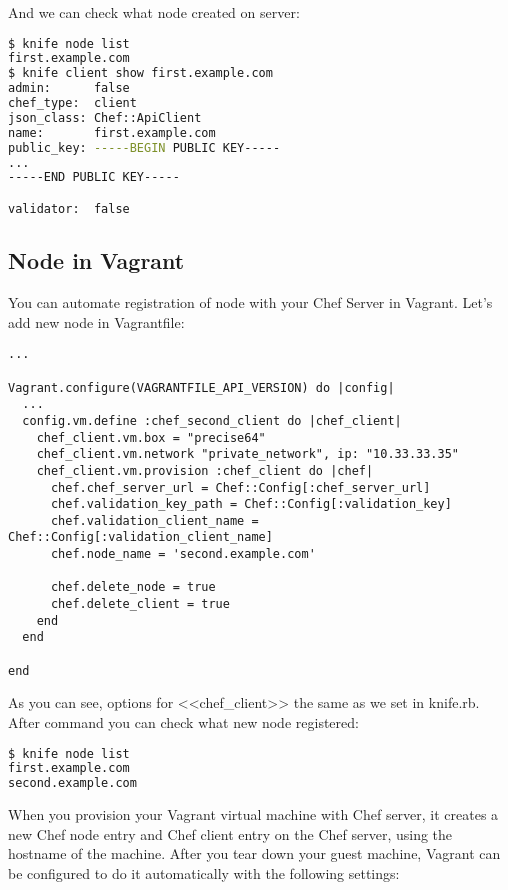 And we can check what node created on server:

\begin{lstlisting}[language=Bash,label=lst:my-server-cloud-node6]
$ knife node list
first.example.com
$ knife client show first.example.com
admin:      false
chef_type:  client
json_class: Chef::ApiClient
name:       first.example.com
public_key: -----BEGIN PUBLIC KEY-----
...
-----END PUBLIC KEY-----

validator:  false
\end{lstlisting}

\subsection{Node in Vagrant}

You can automate registration of node with your Chef Server in Vagrant. Let's add new node in Vagrantfile:

\begin{lstlisting}[label=lst:my-server-cloud-node7,title=my-server-cloud/Vagrantfile]
...

Vagrant.configure(VAGRANTFILE_API_VERSION) do |config|
  ...
  config.vm.define :chef_second_client do |chef_client|
    chef_client.vm.box = "precise64"
    chef_client.vm.network "private_network", ip: "10.33.33.35"
    chef_client.vm.provision :chef_client do |chef|
      chef.chef_server_url = Chef::Config[:chef_server_url]
      chef.validation_key_path = Chef::Config[:validation_key]
      chef.validation_client_name = Chef::Config[:validation_client_name]
      chef.node_name = 'second.example.com'

      chef.delete_node = true
      chef.delete_client = true
    end
  end

end
\end{lstlisting}

As you can see, options for <<chef\_client>> the same as we set in knife.rb. After command  you can check what new node registered:

\begin{lstlisting}[language=Bash,label=lst:my-server-cloud-node10]
$ knife node list
first.example.com
second.example.com
\end{lstlisting}

When you provision your Vagrant virtual machine with Chef server, it creates a new Chef node entry and Chef client entry on the Chef server, using the hostname of the machine. After you tear down your guest machine, Vagrant can be configured to do it automatically with the following settings:

